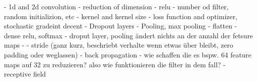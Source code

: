 - 1d and 2d convolution
- reduction of dimension
- relu 
- number od filter, random initializion, etc
- kernel and kernel size
- loss function and optimizer, stochastic gradeint decent
- Dropout layers
- Pooling, max pooling 
- flatten
- dense relu, softmax
- droput layer, pooling ändert nichts an der anzahl der fetsure maps
- 
- stride (ganz kurz, beschriebt verhalte wenn etwas über bleibt, zero padding oder weglassen)
- back propagation
- wie schaffen die es bspw. 64 feature maps auf 32 zu reduzieren? also wie funktionieren die filter in dem fall? 
- receptive field 
  


